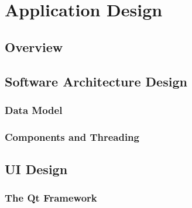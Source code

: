 
\chapter[Application Design]{Application Design} %

\label{Chapter8} %


\section{Overview}



\section{Software Architecture Design}

\subsection{Data Model}
\subsection{Components and Threading}



\section{UI Design}

\subsection{The Qt Framework}


